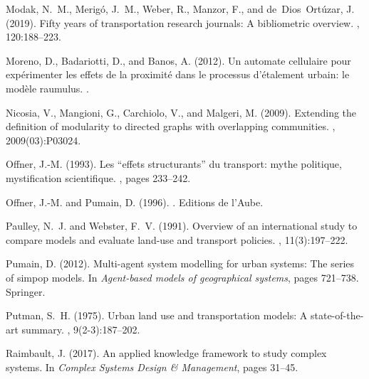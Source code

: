 \documentclass[10pt]{article}
\begin{document}
\begin{thebibliography}{}
Modak, N.~M., Merig{\'o}, J.~M., Weber, R., Manzor, F., and
  de~Dios~Ort{\'u}zar, J. (2019).
\newblock Fifty years of transportation research journals: A bibliometric
  overview.
,
  120:188--223.

Moreno, D., Badariotti, D., and Banos, A. (2012).
\newblock Un automate cellulaire pour exp{\'e}rimenter les effets de la
  proximit{\'e} dans le processus d’{\'e}talement urbain: le mod{\`e}le
  raumulus.
.

Nicosia, V., Mangioni, G., Carchiolo, V., and Malgeri, M. (2009).
\newblock Extending the definition of modularity to directed graphs with
  overlapping communities.
,
  2009(03):P03024.

Offner, J.-M. (1993).
\newblock Les ``effets structurants'' du transport: mythe politique,
  mystification scientifique.
, pages 233--242.

Offner, J.-M. and Pumain, D. (1996).
.
\newblock Editions de l'Aube.

Paulley, N.~J. and Webster, F.~V. (1991).
\newblock Overview of an international study to compare models and evaluate
  land-use and transport policies.
, 11(3):197--222.

Pumain, D. (2012).
\newblock Multi-agent system modelling for urban systems: The series of simpop
  models.
\newblock In {\em Agent-based models of geographical systems}, pages 721--738.
  Springer.

Putman, S.~H. (1975).
\newblock Urban land use and transportation models: A state-of-the-art summary.
, 9(2-3):187--202.

Raimbault, J. (2017).
\newblock An applied knowledge framework to study complex systems.
\newblock In {\em Complex Systems Design \& Management}, pages 31--45.


\end{thebibliography}
\end{document}
